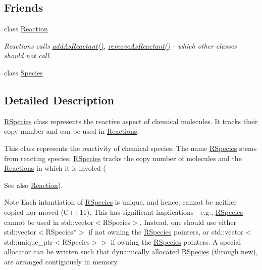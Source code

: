 \subsection*{Friends}
\begin{DoxyCompactItemize}
\item 
class \hyperlink{classchem_1_1RSpecies_a5f86463029cca47f8aa15ff8cd5b9e51}{Reaction}
\begin{DoxyCompactList}\small\item\em Reactions calls \hyperlink{classchem_1_1RSpecies_a88c4e30858e503105a3fa39e649060ef}{add\-As\-Reactant()}, \hyperlink{classchem_1_1RSpecies_ad0a8e2da5b7a0362b1fb20ad72671005}{remove\-As\-Reactant()} -\/ which other classes should not call. \end{DoxyCompactList}\item 
class \hyperlink{classchem_1_1RSpecies_a4f9920dbd864c252e3275a3f4f09dd84}{Species}
\end{DoxyCompactItemize}


\subsection{Detailed Description}
\hyperlink{classchem_1_1RSpecies}{R\-Species} class represents the reactive aspect of chemical molecules. It tracks their copy number and can be used in \hyperlink{classchem_1_1Reaction}{Reactions}. 

This class represents the reactivity of chemical species. The name \hyperlink{classchem_1_1RSpecies}{R\-Species} stems from reacting species. \hyperlink{classchem_1_1RSpecies}{R\-Species} tracks the copy number of molecules and the \hyperlink{classchem_1_1Reaction}{Reactions} in which it is involed (\begin{DoxySeeAlso}{See also}
\hyperlink{classchem_1_1Reaction}{Reaction}). 
\end{DoxySeeAlso}
\begin{DoxyNote}{Note}
Each intantiation of \hyperlink{classchem_1_1RSpecies}{R\-Species} is unique, and hence, cannot be neither copied nor moved (C++11). This has significant implications -\/ e.\-g., \hyperlink{classchem_1_1RSpecies}{R\-Species} cannot be used in std\-::vector$<$\-R\-Species$>$. Instead, one should use either std\-::vector$<$\-R\-Species$\ast$$>$ if not owning the \hyperlink{classchem_1_1RSpecies}{R\-Species} pointers, or std\-::vector$<$std\-::unique\-\_\-ptr$<$\-R\-Species$>$$>$ if owning the \hyperlink{classchem_1_1RSpecies}{R\-Species} pointers. A special allocator can be written such that dynamically allocated \hyperlink{classchem_1_1RSpecies}{R\-Species} (through new), are arranged contigiously in memory. 
\end{DoxyNote}


